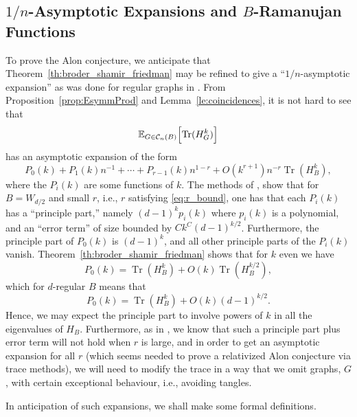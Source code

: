 \documentclass{memo-l}
\theoremstyle{plain}
\theoremstyle{definition}
\numberwithin{section}{chapter}
\numberwithin{equation}{chapter}
\newcommand{\cal}{\mathcal}
\newcommand{\cc}{{\cal C}}
\DeclareMathOperator{\Tr}{Tr}
\theoremstyle{plain}
\theoremstyle{definition}
\newcommand\EE{\mathbb{E}}
\begin{document}
\subsection{$1/n$-Asymptotic Expansions and $B$-Ramanujan Functions}

To prove the Alon conjecture, we anticipate that 
Theorem~\ref{th:broder_shamir_friedman} may be refined to give
a ``$1/n$-asymptotic expansion'' as was done for regular graphs
in \cite{friedman_random_graphs,friedman_alon}.  From
Proposition~\ref{prop:EsymmProd} and 
Lemma~\ref{le:coincidences}, it is not hard to see that
$$
\EE_{G\in\cc_n(B)}\Bigl[ \Tr(H_G^k) \Bigr] 
$$
has an asymptotic expansion of the form
$$
P_0(k) + P_1(k) n^{-1} + \cdots + P_{r-1}(k) n^{1-r} + 
O(k^{r+1}) n^{-r} \Tr(H_B^k),
$$
where the $P_i(k)$ are some functions of $k$.
The methods of
\cite{friedman_random_graphs}, show that for $B=W_{d/2}$ and small $r$,
i.e., $r$ satisfying \eqref{eq:r_bound}, one has that 
each $P_i(k)$ has a ``principle part,'' namely $(d-1)^k p_i(k)$
where $p_i(k)$ is a polynomial, and an ``error term''
of size bounded by $Ck^C (d-1)^{k/2}$.
Furthermore, the principle part of $P_0(k)$ is $(d-1)^k$, and
all other principle parts of the $P_i(k)$ vanish.
Theorem~\ref{th:broder_shamir_friedman} shows that for $k$ even we have
$$
P_0(k) = \Tr(H_B^k) + O(k) \Tr(H_B^{k/2}) ,
$$
which for $d$-regular $B$ means that 
$$
P_0(k) = \Tr(H_B^k) + O(k) (d-1)^{k/2}.
$$
Hence, we may expect the principle part to involve powers of $k$ in
all the eigenvalues of $H_B$.
Furthermore, as in \cite{friedman_alon}, we know that such a 
principle part plus error term will not hold when $r$ is large,
and in order to get an asymptotic expansion for all $r$ (which seems
needed to prove a relativized Alon conjecture via trace
methods), we will need to
modify the trace in a way that we omit graphs, $G$, with certain
exceptional behaviour, i.e., avoiding tangles.

In anticipation of such expansions, we shall make some formal definitions.
\end{document}
